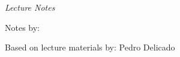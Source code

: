 
\thispagestyle{empty}
\clearpage
\setcounter{page}{-1}

\makeatletter
\begin{titlepage}
{
    \centering
    \vspace{10em}
    \null%
    \vspace{3em}
    {\Huge \bfseries \@title \par}
    \vspace{1em}
    {\Huge \itshape Lecture Notes \par}
    \vspace{2em}
    {\large \scshape \@date \par}
    \vfill
\begin{center}
\end{center}
    \vspace{5em}

    \vfill
    {\raggedleft \large Notes by: \@author \par}
    \vspace{2em}
    {\raggedleft \large Based on lecture materials by: Pedro Delicado \par}
}
\end{titlepage}
\makeatother
